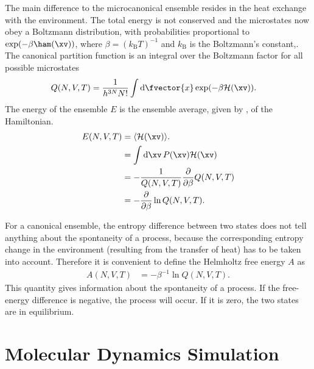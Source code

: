 %
The main difference to the microcanonical ensemble 
resides in
the heat exchange with the environment.
The total energy is not
conserved
and the microstates now
obey a Boltzmann
distribution, with probabilities proportional to $\exp(-\beta \ham(\xv))$,
where $\beta=(k_{\mathrm{B}}T)^{-1}$ and $k_{\mathrm{B}}$ is the Boltzmann's constant,.
  The canonical partition
function is an integral over the Boltzmann factor for all possible
microstates
%
\begin{align}
    Q(N, V, T) &= \frac{1}{h^{3N}N!}\int \mathrm{d}\fvector{x} \exp(-\beta\mathcal{H}(\xv)) .
\label{eq:partfct}
\end{align}
%
The energy of the ensemble $E$
is the ensemble average, 
given by , of the Hamiltonian.
%
\begin{align}
    E(N,V,T)&=\langle \mathcal{H}(\xv) \rangle. \nonumber\\
    &=\int \mathrm{d}\xv\, P(\xv) \mathcal{H}(\xv) \nonumber \\
    &=-\frac{1}{Q(N,V,T)} \frac{\partial}{\partial \beta}Q(N,V,T) \nonumber \\
    &=-\frac{\partial}{\partial \beta} \ln Q(N,V,T) .
\end{align}
%

For a canonical ensemble, the entropy difference between two states does not
tell anything about the spontaneity of a process, because the 
corresponding entropy  change in the environment (resulting from the transfer of heat)
has to be taken into account.
Therefore it is convenient to define the Helmholtz free energy $A$ as
%
\begin{align}
    A(N,V,T)&=-\beta^{-1} \ln Q(N,V,T).
\end{align}
%
This quantity 
gives information about the spontaneity of a process. If the
free-energy difference is negative, the process will occur. If it is zero, 
the two states are in equilibrium. 
%



\section{Molecular Dynamics Simulation}


